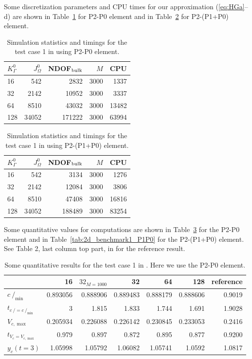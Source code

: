 \documentclass[a4paper,12pt,onecolumn]{article}
\newcommand{\strikec}{\mbox{$c\!\!\!\!\:/$}}
\begin{document}
Some discretization parameters and CPU times for our approximation
(\ref{eq:HGa}--d) are shown in Table~\ref{tab:2d_CPU_P0} for P2-P0 element and
in Table~\ref{tab:2d_CPU_P1P0} for P2-(P1+P0) element.
\begin{table}
\center
\begin{tabular}{lrrrr}
\hline
$K^0_\Gamma$ & $J^0_\Omega$ & NDOF$_{\rm bulk}$ & $M$ & CPU \\
\hline
16 & 542 & 2832 & 3000 & 1337 \\
32 & 2142 & 10952 & 3000 & 3337 \\
64 & 8510 & 43032 & 3000 & 13482 \\
128 & 34052 & 171222 & 3000 & 63994 \\
\hline
\end{tabular}
\caption{Simulation statistics and timings for the test case 1 in
\cite{HysingTKPBGT09} using P2-P0 element.}
\label{tab:2d_CPU_P0}
\end{table}

\begin{table}
\center
\begin{tabular}{lrrrr}
\hline
$K^0_\Gamma$ & $J^0_\Omega$ & NDOF$_{\rm bulk}$ & $M$ & CPU \\
\hline
16 & 542 & 3134 & 3000 & 1276 \\
32 & 2142 & 12084 & 3000 & 3806 \\
64 & 8510 & 47408 & 3000 & 16816 \\
128 & 34052 & 188489 & 3000 & 83254 \\
\hline
\end{tabular}
\caption{Simulation statistics and timings for the test case 1 in
\cite{HysingTKPBGT09} using P2-(P1+P0) element.}
\label{tab:2d_CPU_P1P0}
\end{table}

Some quantitative values for computations are shown in
Table~\ref{tab:2d_benchmark1_P0} for the P2-P0 element and
in Table~\ref{tab:2d_benchmark1_P1P0} for the P2-(P1+P0) element. See Table 2,
last column top part, in \cite{fluidfbp} for the reference result.

\begin{table}
\center
\begin{tabular}{lrrrrrr}
\hline
& 16 & $32_{M=1000}$ & 32 & 64 & 128 & reference \\
\hline
$\strikec_{\min}$ & 0.893056 & 0.888906 & 0.889483 & 0.888179 & 0.888606 &
0.9019 \\
$t_{\strikec = \strikec_{\min}}$ & 3 & 1.815 & 1.833 & 1.744 & 1.691 & 1.9028 \\
$V_{c,\max}$ & 0.205934 & 0.226088 & 0.226142 & 0.230845 & 0.233053 & 0.2416 \\
$t_{V_c = V_{c,\max}}$ & 0.979 & 0.897 & 0.872 & 0.895 & 0.877 & 0.9200 \\
$y_c(t=3)$ & 1.05998 & 1.05792 & 1.06082 & 1.05741 & 1.0592  & 1.0817 \\
\hline
\end{tabular}
\caption{Some quantitative results for the test case 1 in
\cite{HysingTKPBGT09}. Here we use the P2-P0 element.}
\label{tab:2d_benchmark1_P0}
\end{table}
\end{document}
